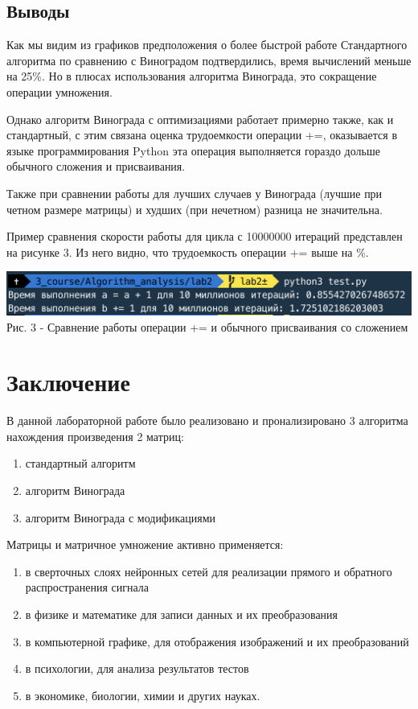\documentclass[a4paper,14pt]{article} %
\newcommand{\anonsection}[1]{\section*{#1}\addcontentsline{toc}{section}{#1}}
\begin{document}
	\subsection{Выводы}
	\hfill
	
	Как мы видим из графиков предположения о более быстрой работе Стандартного алгоритма по сравнению с Виноградом подтвердились, время вычислений меньше на 25\%. Но в плюсах использования алгоритма Винограда, это сокращение операции умножения. 
	
	Однако алгоритм Винограда с оптимизациями работает примерно также, как и стандартный, с этим связана оценка трудоемкости операции +=, оказывается в языке программирования Python эта операция выполняется гораздо дольше обычного сложения и присваивания.
	
	Также при сравнении работы для лучших случаев у Винограда (лучшие при четном размере матрицы) и худших (при нечетном) разница не значительна. 
	
	Пример сравнения скорости работы для цикла с 10000000 итераций представлен на рисунке 3. Из него видно, что трудоемкость операции += выше на \%. 
	
	\begin{center}
		\includegraphics[scale = 0.8]{test} \\ Рис. 3 - Сравнение работы операции += и обычного присваивания со сложением
	\end{center}

   	\newpage

        \anonsection{Заключение}
        
        \hfill
        
        В данной лабораторной работе было реализовано и пронализировано 3 алгоритма нахождения произведения 2 матриц:
	\begin{enumerate}
	 	\item стандартный алгоритм 
		\item алгоритм Винограда
		\item алгоритм Винограда с модификациями 
	\end{enumerate}
	
	\hfill
	
	Матрицы и матричное умножение активно применяется:
	\begin{enumerate}
		\item в сверточных слоях нейронных сетей для реализации прямого и обратного распространения сигнала
		\item в физике и математике для записи данных и их преобразования
		\item в компьютерной графике, для отображения изображений и их преобразований
		\item в психологии, для анализа результатов тестов
		\item в экономике, биологии, химии и других науках. 
	\end{enumerate}
	
\end{document}
